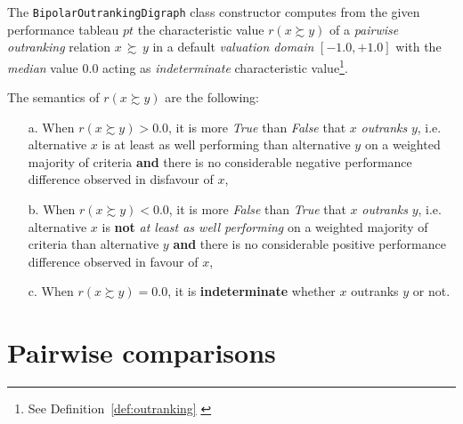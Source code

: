 The \texttt{BipolarOutrankingDigraph} class constructor computes from the given performance tableau $pt$ the characteristic value $r(x \succsim y)$ of a \emph{pairwise outranking} relation $x\, \succsim \,y$ in a default \emph{valuation domain} $[-1.0,+1.0]$ with the {\em median\/} value $0.0$ acting as \emph{indeterminate} characteristic value\footnote{See Definition~\ref{def:outranking} \citep{BIS-2013}}. 

\begin{definition} The semantics of $r(x \succsim y)$ are the following:
\begin{itemize}
\item [a.] When $r(x \succsim y) > 0.0$, it is more {\em True\/} than {\em False\/} that $x$ \emph{outranks} $y$, i.e. alternative $x$ is at least as well performing than alternative $y$ on a weighted majority of criteria {\bf and} there is no considerable negative performance difference observed in disfavour of $x$,
\item [b.] When $r(x \succsim y) < 0.0$, it is more {\em False\/} than {\em True\/} that $x$ \emph{outranks} $y$, i.e. alternative $x$ is {\bf not} \emph{at least as well performing} on a weighted majority of criteria than alternative $y$ {\bf and} there is no considerable positive performance difference observed in favour of $x$,
\item [c.] When $r(x \succsim y) = 0.0$, it is {\bf indeterminate} whether $x$ outranks $y$ or not.
\end{itemize}
\end{definition}

\section{Pairwise comparisons}
\label{sec:3.3}

